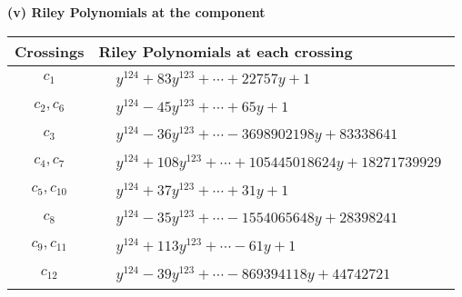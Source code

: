 \documentclass[1p]{elsarticle_modified}
\theoremstyle{definition}
\begin{document}
\newpage\renewcommand{\arraystretch}{1}
\flushleft \textbf{(v) Riley Polynomials at the component}\newline \\
\begin{tabular}{m{50pt}|m{274pt}}
Crossings & \hspace{64pt}Riley Polynomials at each crossing \\
\hline $$\begin{aligned}c_{1}\end{aligned}$$&$\begin{aligned}
&y^{124}+83 y^{123}+\cdots+22757 y+1
\end{aligned}$\\
\hline $$\begin{aligned}c_{2},c_{6}\end{aligned}$$&$\begin{aligned}
&y^{124}-45 y^{123}+\cdots+65 y+1
\end{aligned}$\\
\hline $$\begin{aligned}c_{3}\end{aligned}$$&$\begin{aligned}
&y^{124}-36 y^{123}+\cdots-3698902198 y+83338641
\end{aligned}$\\
\hline $$\begin{aligned}c_{4},c_{7}\end{aligned}$$&$\begin{aligned}
&y^{124}+108 y^{123}+\cdots+105445018624 y+18271739929
\end{aligned}$\\
\hline $$\begin{aligned}c_{5},c_{10}\end{aligned}$$&$\begin{aligned}
&y^{124}+37 y^{123}+\cdots+31 y+1
\end{aligned}$\\
\hline $$\begin{aligned}c_{8}\end{aligned}$$&$\begin{aligned}
&y^{124}-35 y^{123}+\cdots-1554065648 y+28398241
\end{aligned}$\\
\hline $$\begin{aligned}c_{9},c_{11}\end{aligned}$$&$\begin{aligned}
&y^{124}+113 y^{123}+\cdots-61 y+1
\end{aligned}$\\
\hline $$\begin{aligned}c_{12}\end{aligned}$$&$\begin{aligned}
&y^{124}-39 y^{123}+\cdots-869394118 y+44742721
\end{aligned}$\\
\hline
\end{tabular}\\~\\
\end{document}
